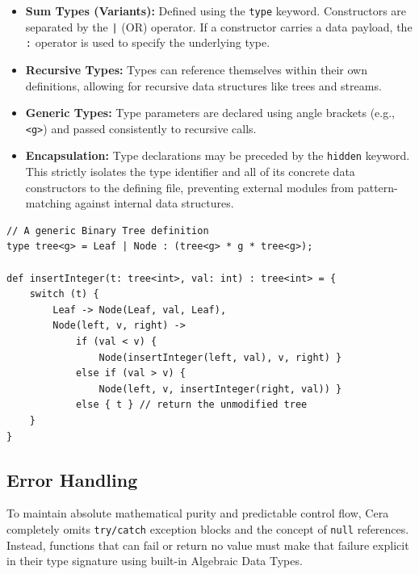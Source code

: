 \documentclass[11pt, a4paper]{article}
\begin{document}
\begin{itemize}
    \item \textbf{Sum Types (Variants):} Defined using the \texttt{type} keyword. Constructors are separated by the \texttt{|} (OR) operator. If a constructor carries a data payload, the \texttt{:} operator is used to specify the underlying type.
    \item \textbf{Recursive Types:} Types can reference themselves within their own definitions, allowing for recursive data structures like trees and streams.
    \item \textbf{Generic Types:} Type parameters are declared using angle brackets (e.g., \texttt{<g>}) and passed consistently to recursive calls.
    \item \textbf{Encapsulation:} Type declarations may be preceded by the \texttt{hidden} keyword. This strictly isolates the type identifier and all of its concrete data constructors to the defining file, preventing external modules from pattern-matching against internal data structures.
\end{itemize}

\begin{lstlisting}[language=Cera, title={Recursive Immutable Data Structures}, basicstyle=\ttfamily]
// A generic Binary Tree definition
type tree<g> = Leaf | Node : (tree<g> * g * tree<g>);

def insertInteger(t: tree<int>, val: int) : tree<int> = {
    switch (t) {
        Leaf -> Node(Leaf, val, Leaf),
        Node(left, v, right) -> 
            if (val < v) { 
                Node(insertInteger(left, val), v, right) }
            else if (val > v) { 
                Node(left, v, insertInteger(right, val)) }
            else { t } // return the unmodified tree
    }
}
\end{lstlisting}

\subsection{Error Handling}
\noindent
To maintain absolute mathematical purity and predictable control flow, Cera completely omits \texttt{try/catch} exception blocks and the concept of \texttt{null} references. Instead, functions that can fail or return no value must make that failure explicit in their type signature using built-in Algebraic Data Types.
\end{document}
